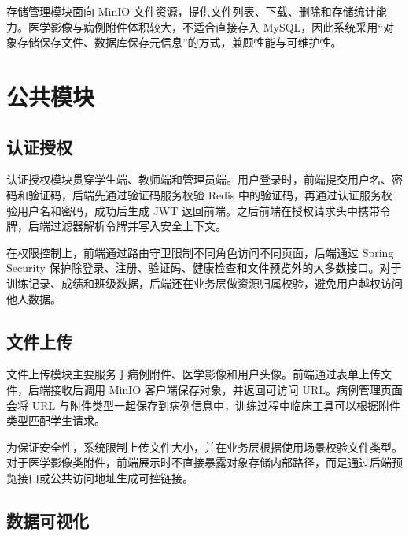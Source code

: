 存储管理模块面向 MinIO 文件资源，提供文件列表、下载、删除和存储统计能力。医学影像与病例附件体积较大，不适合直接存入 MySQL，因此系统采用“对象存储保存文件、数据库保存元信息”的方式，兼顾性能与可维护性。

\section{公共模块}

\subsection{认证授权}

认证授权模块贯穿学生端、教师端和管理员端。用户登录时，前端提交用户名、密码和验证码，后端先通过验证码服务校验 Redis 中的验证码，再通过认证服务校验用户名和密码，成功后生成 JWT 返回前端。之后前端在授权请求头中携带令牌，后端过滤器解析令牌并写入安全上下文。


在权限控制上，前端通过路由守卫限制不同角色访问不同页面，后端通过 Spring Security 保护除登录、注册、验证码、健康检查和文件预览外的大多数接口。对于训练记录、成绩和班级数据，后端还在业务层做资源归属校验，避免用户越权访问他人数据。

\subsection{文件上传}

文件上传模块主要服务于病例附件、医学影像和用户头像。前端通过表单上传文件，后端接收后调用 MinIO 客户端保存对象，并返回可访问 URL。病例管理页面会将 URL 与附件类型一起保存到病例信息中，训练过程中临床工具可以根据附件类型匹配学生请求。

为保证安全性，系统限制上传文件大小，并在业务层根据使用场景校验文件类型。对于医学影像类附件，前端展示时不直接暴露对象存储内部路径，而是通过后端预览接口或公共访问地址生成可控链接。

\subsection{数据可视化}

